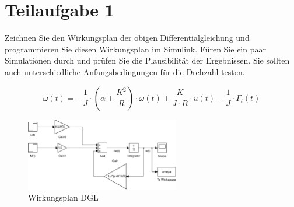 \section{Teilaufgabe 1}
\begin{aufgabe}
    Zeichnen Sie den Wirkungsplan der obigen Differentialgleichung und 
    programmieren Sie diesen Wirkungsplan im Simulink. Füren Sie ein paar 
    Simulationen durch und prüfen Sie die Plausibilität der Ergebnissen. Sie 
    sollten auch unterschiedliche Anfangsbedingungen für die Drehzahl testen.
\end{aufgabe}
\[ \dot{\omega}(t) 
    = -\frac{1}{J} \cdot \left(\alpha + \frac{K^2}{R}\right) \cdot \omega(t) 
    + \frac{K}{J \cdot R} \cdot u(t) - \frac{1}{J} \cdot \Gamma_l(t) \]
\begin{figure}[h!]
    \centering
    \includegraphics[width=0.6\textwidth]{01/wirkungsplan.pdf}
    \caption{Wirkungsplan DGL}
    \label{fig:01}
\end{figure}
